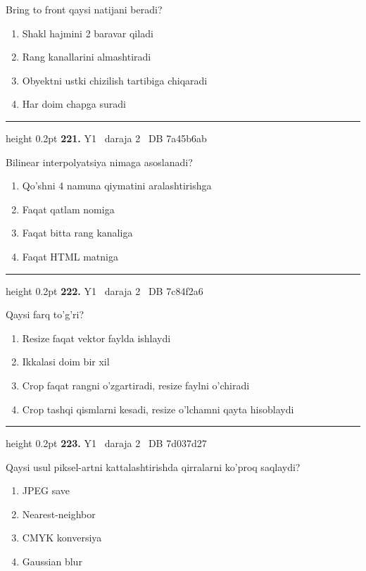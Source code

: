 \documentclass[10pt,a4paper,oneside]{article}
\begin{document}
\par
Bring to front qaysi natijani beradi?
\begin{enumerate}[label=\Alph*),leftmargin=9mm]
\item Shakl hajmini 2 baravar qiladi
\item Rang kanallarini almashtiradi
\item Obyektni ustki chizilish tartibiga chiqaradi
\item Har doim chapga suradi
\end{enumerate}
\vspace{2mm}\hrule height 0.2pt \vspace{4mm}
\hypertarget{q221}{\textbf{\color{ink}221.}}  {\color{muted}\scriptsize Y1 \textbullet\ daraja 2 \textbullet\ DB 7a45b6ab}
\par
Bilinear interpolyatsiya nimaga asoslanadi?
\begin{enumerate}[label=\Alph*),leftmargin=9mm]
\item Qo'shni 4 namuna qiymatini aralashtirishga
\item Faqat qatlam nomiga
\item Faqat bitta rang kanaliga
\item Faqat HTML matniga
\end{enumerate}
\vspace{2mm}\hrule height 0.2pt \vspace{4mm}
\hypertarget{q222}{\textbf{\color{ink}222.}}  {\color{muted}\scriptsize Y1 \textbullet\ daraja 2 \textbullet\ DB 7c84f2a6}
\par
Qaysi farq to'g'ri?
\begin{enumerate}[label=\Alph*),leftmargin=9mm]
\item Resize faqat vektor faylda ishlaydi
\item Ikkalasi doim bir xil
\item Crop faqat rangni o'zgartiradi, resize faylni o'chiradi
\item Crop tashqi qismlarni kesadi, resize o'lchamni qayta hisoblaydi
\end{enumerate}
\vspace{2mm}\hrule height 0.2pt \vspace{4mm}
\hypertarget{q223}{\textbf{\color{ink}223.}}  {\color{muted}\scriptsize Y1 \textbullet\ daraja 2 \textbullet\ DB 7d037d27}
\par
Qaysi usul piksel-artni kattalashtirishda qirralarni ko'proq saqlaydi?
\begin{enumerate}[label=\Alph*),leftmargin=9mm]
\item JPEG save
\item Nearest-neighbor
\item CMYK konversiya
\item Gaussian blur
\end{enumerate}
\end{document}
